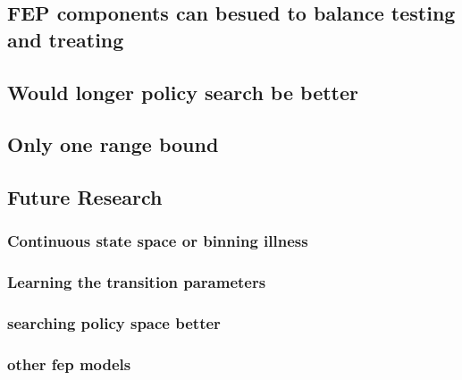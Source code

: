 \documentclass[notspecified,article,submit,moreauthors,pdftex]{Definitions/mdpi}
\begin{document}
\subsection{FEP components can besued to balance testing and
treating}\label{fep-components-can-besued-to-balance-testing-and-treating}

\subsection{Would longer policy search be
better}\label{would-longer-policy-search-be-better}

\subsection{Only one range bound}\label{only-one-range-bound}

\subsection{Future Research}\label{future-research}

\subsubsection{Continuous state space or binning
illness}\label{continuous-state-space-or-binning-illness}

\subsubsection{Learning the transition
parameters}\label{learning-the-transition-parameters}

\subsubsection{searching policy space
better}\label{searching-policy-space-better}

\subsubsection{other fep models}\label{other-fep-models}


\vspace{6pt}

\end{document}
